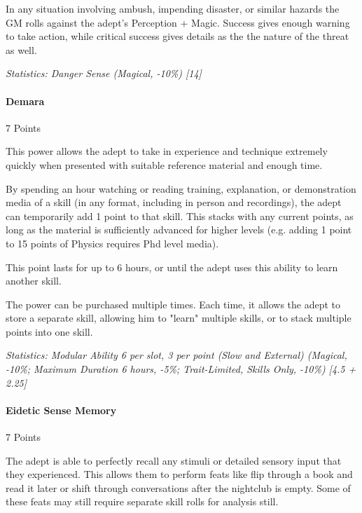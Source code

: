 \begin{multicols}{3}
	In any situation involving ambush, impending disaster, or similar hazards the GM rolls against the adept's Perception + Magic. Success gives enough warning to take action, while critical success gives details as the the nature of the threat as well.

	\textcolor{OliveGreen}{\textit{Statistics: Danger Sense (Magical, -10\%) [14] }}
	
	
	\paragraph{Demara}
	\begin{flushright}
		7 Points
	\end{flushright}

	This power allows the adept to take in experience and technique extremely quickly when presented with suitable reference material and enough time.
	
	By spending an hour watching or reading training, explanation, or demonstration media of a skill (in any format, including in person and recordings), the adept can temporarily add 1 point to that skill. This stacks with any current points, as long as the material is sufficiently advanced for higher levels (e.g. adding 1 point to 15 points of Physics requires Phd level media).
	
	This point lasts for up to 6 hours, or until the adept uses this ability to learn another skill.
	
	The power can be purchased multiple times. Each time, it allows the adept to store a separate skill, allowing him to "learn" multiple skills, or to stack multiple points into one skill.

	\textcolor{OliveGreen}{\textit{Statistics: Modular Ability 6 per slot, 3 per point (Slow and External) (Magical, -10\%; Maximum Duration 6 hours, -5\%; Trait-Limited, Skills Only, -10\%) [4.5 + 2.25] }}
	
	
	\paragraph{Eidetic Sense Memory}
	\begin{flushright}
		7 Points
	\end{flushright}

	The adept is able to perfectly recall any stimuli or detailed sensory input that they experienced. This allows them to perform feats like flip through a book and read it later or shift through conversations after the nightclub is empty. Some of these feats may still require separate skill rolls for analysis still.
	

\end{multicols}
